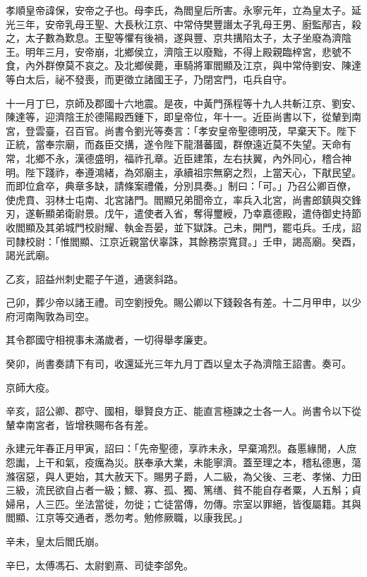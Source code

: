 
\begin{pinyinscope}
孝順皇帝諱保，安帝之子也。母李氏，為閻皇后所害。永寧元年，立為皇太子。延光三年，安帝乳母王聖、大長秋江京、中常侍樊豐譖太子乳母王男、廚監邴吉，殺之，太子數為歎息。王聖等懼有後禍，遂與豐、京共搆陷太子，太子坐廢為濟陰王。明年三月，安帝崩，北鄉侯立，濟陰王以廢黜，不得上殿親臨梓宮，悲號不食，內外群僚莫不哀之。及北鄉侯薨，車騎將軍閻顯及江京，與中常侍劉安、陳達等白太后，祕不發喪，而更徵立諸國王子，乃閉宮門，屯兵自守。

十一月丁巳，京師及郡國十六地震。是夜，中黃門孫程等十九人共斬江京、劉安、陳達等，迎濟陰王於德陽殿西鍾下，即皇帝位，年十一。近臣尚書以下，從輦到南宮，登雲臺，召百官。尚書令劉光等奏言：「孝安皇帝聖德明茂，早棄天下。陛下正統，當奉宗廟，而姦臣交搆，遂令陛下龍潛蕃國，群僚遠近莫不失望。天命有常，北鄉不永，漢德盛明，福祚孔章。近臣建策，左右扶翼，內外同心，稽合神明。陛下踐祚，奉遵鴻緒，為郊廟主，承續祖宗無窮之烈，上當天心，下猒民望。而即位倉卒，典章多缺，請條案禮儀，分別具奏。」制曰：「可。」乃召公卿百僚，使虎賁、羽林士屯南、北宮諸門。閻顯兄弟聞帝立，率兵入北宮，尚書郎鎮與交鋒刃，遂斬顯弟衛尉景。戊午，遣使者入省，奪得璽綬，乃幸嘉德殿，遣侍御史持節收閻顯及其弟城門校尉耀、執金吾晏，並下獄誅。己未，開門，罷屯兵。壬戌，詔司隸校尉：「惟閻顯、江京近親當伏辜誅，其餘務崇寬貸。」壬申，謁高廟。癸酉，謁光武廟。

乙亥，詔益州刺史罷子午道，通褒斜路。

己卯，葬少帝以諸王禮。司空劉授免。賜公卿以下錢穀各有差。十二月甲申，以少府河南陶敦為司空。

其令郡國守相視事未滿歲者，一切得舉孝廉吏。

癸卯，尚書奏請下有司，收還延光三年九月丁酉以皇太子為濟陰王詔書。奏可。

京師大疫。

辛亥，詔公卿、郡守、國相，舉賢良方正、能直言極諫之士各一人。尚書令以下從輦幸南宮者，皆增秩賜布各有差。

永建元年春正月甲寅，詔曰：「先帝聖德，享祚未永，早棄鴻烈。姦慝緣閒，人庶怨讟，上干和氣，疫癘為災。朕奉承大業，未能寧濟。蓋至理之本，稽私德惠，蕩滌宿惡，與人更始，其大赦天下。賜男子爵，人二級，為父後、三老、孝悌、力田三級，流民欲自占者一級；鰥、寡、孤、獨、篤缮、貧不能自存者粟，人五斛；貞婦帛，人三匹。坐法當徙，勿徙；亡徒當傳，勿傳。宗室以罪絕，皆復屬籍。其與閻顯、江京等交通者，悉勿考。勉修厥職，以康我民。」

辛未，皇太后閻氏崩。

辛巳，太傅馮石、太尉劉熹、司徒李郃免。


\end{pinyinscope}
